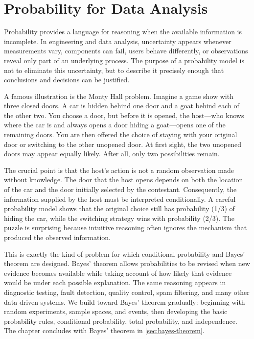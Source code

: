 \chapter{Probability for Data Analysis}
\label{ch:probability-data-analysis}

Probability provides a language for reasoning when the available information is incomplete. In engineering and data analysis, uncertainty appears whenever measurements vary, components can fail, users behave differently, or observations reveal only part of an underlying process. The purpose of a probability model is not to eliminate this uncertainty, but to describe it precisely enough that conclusions and decisions can be justified.

A famous illustration is the Monty Hall problem. Imagine a game show with three closed doors. A car is hidden behind one door and a goat behind each of the other two. You choose a door, but before it is opened, the host---who knows where the car is and always opens a door hiding a goat---opens one of the remaining doors. You are then offered the choice of staying with your original door or switching to the other unopened door. At first sight, the two unopened doors may appear equally likely. After all, only two possibilities remain.

The crucial point is that the host's action is not a random observation made without knowledge. The door that the host opens depends on both the location of the car and the door initially selected by the contestant. Consequently, the information supplied by the host must be interpreted conditionally. A careful probability model shows that the original choice still has probability (1/3) of hiding the car, while the switching strategy wins with probability (2/3). The puzzle is surprising because intuitive reasoning often ignores the mechanism that produced the observed information.

This is exactly the kind of problem for which conditional probability and Bayes' theorem are designed. Bayes' theorem allows probabilities to be revised when new evidence becomes available while taking account of how likely that evidence would be under each possible explanation. The same reasoning appears in diagnostic testing, fault detection, quality control, spam filtering, and many other data-driven systems. We build toward Bayes' theorem gradually: beginning with random experiments, sample spaces, and events, then developing the basic probability rules, conditional probability, total probability, and independence. The chapter concludes with Bayes' theorem in \autoref{sec:bayes-theorem}.

